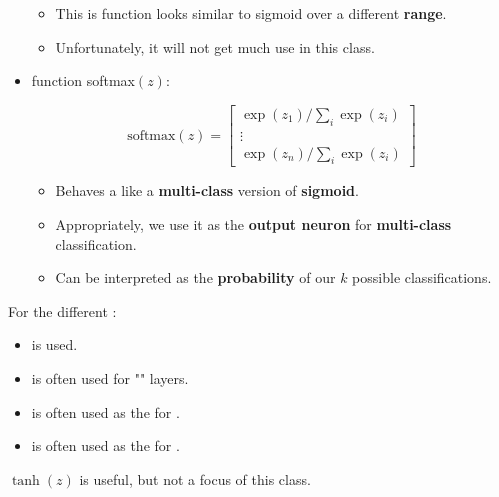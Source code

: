 \begin{itemize}
                \begin{itemize}
                    \item This is function looks similar to sigmoid over a different \textbf{range}.
                    
                    \item Unfortunately, it will not get much use in this class.
                \end{itemize}
                
            \item {} function softmax$(z)$:
                
                \begin{equation}
                    \text{softmax}(z) =
                    \begin{bmatrix}
                        \exp(z_1) / \sum_{i} \exp(z_i) \\
                        \vdots \\
                        \exp(z_n) / \sum_{i} \exp(z_i)
                    \end{bmatrix}
                \end{equation}
                
                \begin{itemize}
                    \item Behaves a like a \textbf{multi-class} version of \textbf{sigmoid}.
                    
                    \item Appropriately, we use it as the \textbf{output neuron} for \textbf{multi-class} classification.
                    
                    \item Can be interpreted as the \textbf{probability} of our $k$ possible classifications.
                \end{itemize}
        \end{itemize}
        
    \begin{concept}
        For the different :
        
        \begin{itemize}
            \item {} is  used.
            
            \item {} is often used for "" layers.
            
            \item {} is often used as the  for .
            
            \item {} is often used as the  for .
        \end{itemize}
        $\tanh(z)$ is useful, but not a focus of this class.
    \end{concept}
    
